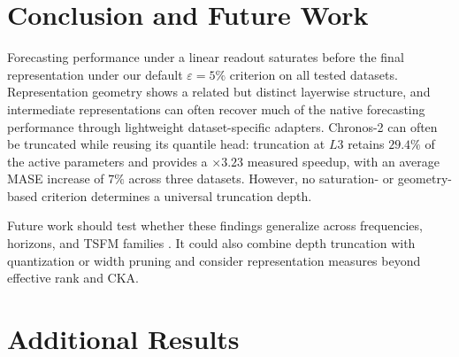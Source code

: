 \documentclass{article}
\begin{document}
\section{Conclusion and Future Work}

Forecasting performance under a linear readout saturates before the final representation under our default \(\varepsilon=5\%\) criterion on all tested datasets. Representation geometry shows a related but distinct layerwise structure, and intermediate representations can often recover much of the native forecasting performance through lightweight dataset-specific adapters. Chronos-2 can often be truncated while reusing its quantile head: truncation at \(L3\) retains \(29.4\%\) of the active parameters and provides a \(\times 3.23\) measured speedup, with an average MASE increase of \(7\%\) across three datasets. However, no saturation- or geometry-based criterion determines a universal truncation depth.

Future work should test whether these findings generalize across frequencies, horizons, and TSFM families \citep{ansari2024chronoslearninglanguagetime, das2024decoderonlyfoundationmodeltimeseries, woo2024unifiedtraininguniversaltime}. It could also combine depth truncation with quantization or width pruning and consider representation measures beyond effective rank and CKA.


\newpage



\newpage
\appendix

\section{Additional Results}



\end{document}
